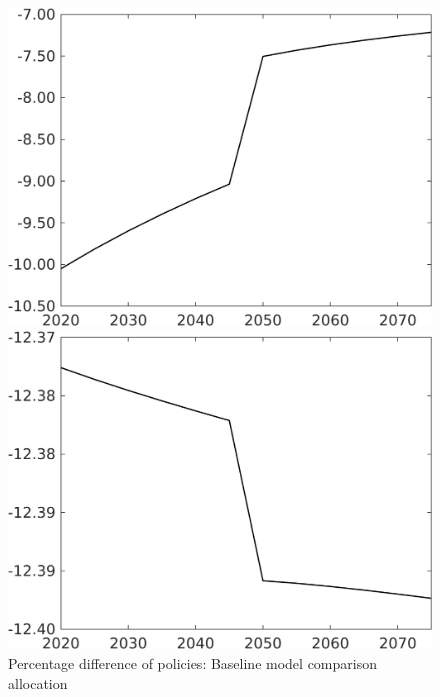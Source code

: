 \documentclass[12pt]{article}
\begin{document}
\begin{figure}[h!!]
	\centering
	\caption{Percentage difference of policies: Baseline model comparison allocation}\label{fig:Pertauf_nsk0_xgr0_notaul}
	\begin{minipage}[]{0.32\textwidth}
		\includegraphics[width=1\textwidth]{../../codding_model/own_basedOnFried/optimalPol_010922_revision/figures/all_13Sept22/CompTaufPER_bytaul_Reg0_tauf_spillover0_nsk0_xgr0_knspil0_sep0_LFlimit1_emsbase0_countec0_GovRev0_etaa0.79_lgd0.png}
	\end{minipage}		
	\begin{minipage}[]{0.32\textwidth}
	\includegraphics[width=1\textwidth]{../../codding_model/own_basedOnFried/optimalPol_010922_revision/figures/all_13Sept22/CompTaufPER_bytaul_Reg0_hh_spillover0_nsk0_xgr0_knspil0_sep0_LFlimit1_emsbase0_countec0_GovRev0_etaa0.79_lgd0.png}

\end{minipage}
\end{figure}
\end{document}
